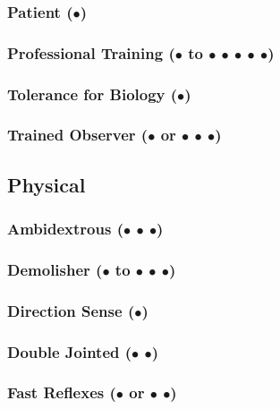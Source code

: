 \documentclass["../Misguided by Starlight.tex"]{subfiles}
\begin{document}
	\subsubsection{Patient ($\bullet$)} %
	
	\subsubsection{Professional Training ($\bullet$ to $\bullet$ $\bullet$ $\bullet$ $\bullet$ $\bullet$)} %
	
	\subsubsection{Tolerance for Biology ($\bullet$)} %
	
	\subsubsection{Trained Observer ($\bullet$ or $\bullet$ $\bullet$ $\bullet$)} %
	
\subsection{Physical}
	\subsubsection{Ambidextrous ($\bullet$ $\bullet$ $\bullet$)} %
	
	\subsubsection{Demolisher ($\bullet$ to $\bullet$ $\bullet$ $\bullet$)} %
	
	\subsubsection{Direction Sense ($\bullet$)} %
	
	\subsubsection{Double Jointed ($\bullet$ $\bullet$)} %
	
	\subsubsection{Fast Reflexes ($\bullet$ or $\bullet$ $\bullet$)} %
	
\end{document}
